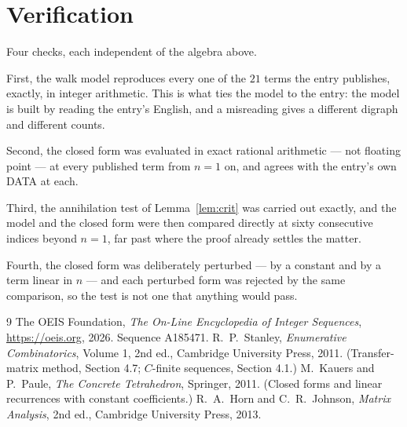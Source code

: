 \documentclass[11pt,a4paper]{article}
\theoremstyle{plain}
\theoremstyle{definition}
\begin{document}
\section{Verification}

Four checks, each independent of the algebra above.

First, the walk model reproduces every one of the $21$ terms the entry publishes,
exactly, in integer arithmetic. This is what ties the model to the entry: the model is built
by reading the entry's English, and a misreading gives a different digraph and different
counts.

Second, the closed form was evaluated in exact rational arithmetic --- not floating point ---
at every published term from $n=1$ on, and agrees with the entry's own DATA at each.

Third, the annihilation test of Lemma~\ref{lem:crit} was carried out exactly, and the model
and the closed form were then compared directly at sixty consecutive indices beyond
$n=1$, far past where the proof already settles the matter.

Fourth, the closed form was deliberately perturbed --- by a constant and by a term linear in
$n$ --- and each perturbed form was rejected by the same comparison, so the test is not one
that anything would pass.

\begin{thebibliography}{9}
 The OEIS Foundation, \emph{The On-Line Encyclopedia of Integer
Sequences}, \url{https://oeis.org}, 2026. Sequence A185471.
 R.~P.~Stanley, \emph{Enumerative Combinatorics}, Volume 1, 2nd ed.,
Cambridge University Press, 2011. (Transfer-matrix method, Section 4.7; $C$-finite sequences,
Section 4.1.)
 M.~Kauers and P.~Paule, \emph{The Concrete Tetrahedron}, Springer, 2011.
(Closed forms and linear recurrences with constant coefficients.)
 R.~A.~Horn and C.~R.~Johnson, \emph{Matrix Analysis}, 2nd ed., Cambridge
University Press, 2013.
\end{thebibliography}
\end{document}
